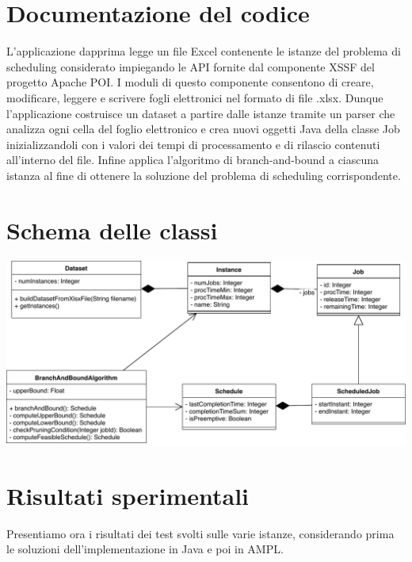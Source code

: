\documentclass[a4paper]{article}
\begin{document}
\section{Documentazione del codice}
L'applicazione dapprima legge un file Excel contenente le istanze del problema di scheduling considerato impiegando le API fornite dal componente XSSF del progetto Apache POI. I moduli di questo componente consentono di creare, modificare, leggere e scrivere fogli elettronici nel formato di file .xlsx. Dunque l'applicazione costruisce un dataset a partire dalle istanze tramite un parser che analizza ogni cella del foglio elettronico e crea nuovi oggetti Java della classe Job inizializzandoli con i valori dei tempi di processamento e di rilascio contenuti all'interno del file. Infine applica l'algoritmo di branch-and-bound a ciascuna istanza al fine di ottenere la soluzione del problema di scheduling corrispondente.

\section{Schema delle classi}
\includegraphics[scale=0.6]{schema_classi.pdf}

\section{Risultati sperimentali}
Presentiamo ora i risultati dei test svolti sulle varie istanze, considerando prima le soluzioni dell'implementazione in Java e poi in AMPL.
\end{document}
